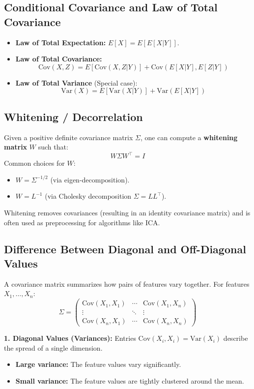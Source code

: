 \documentclass[12pt, a4paper]{report}
\begin{document}
\subsection{Conditional Covariance and Law of Total Covariance}
\begin{itemize}
    \item \textbf{Law of Total Expectation:} $E[X] = E[E[X|Y]]$.
    \item \textbf{Law of Total Covariance:}
    \begin{equation}
        \text{Cov}(X, Z) = E[\text{Cov}(X, Z|Y)] + \text{Cov}(E[X|Y], E[Z|Y])
    \end{equation}
    \item \textbf{Law of Total Variance} (Special case):
    \[ \text{Var}(X) = E[\text{Var}(X|Y)] + \text{Var}(E[X|Y]) \]
\end{itemize}

\subsection{Whitening / Decorrelation}
Given a positive definite covariance matrix $\Sigma$, one can compute a \textbf{whitening matrix} $W$ such that:
\[ W \Sigma W^\top = I \]
Common choices for $W$:
\begin{itemize}
    \item $W = \Sigma^{-1/2}$ (via eigen-decomposition).
    \item $W = L^{-1}$ (via Cholesky decomposition $\Sigma = LL^\top$).
\end{itemize}
Whitening removes covariances (resulting in an identity covariance matrix) and is often used as preprocessing for algorithms like ICA.

\subsection{Difference Between Diagonal and Off-Diagonal Values}
A covariance matrix summarizes how pairs of features vary together. For features $X_1, \dots, X_n$:
\[
\Sigma = \begin{pmatrix}
\text{Cov}(X_1, X_1) & \cdots & \text{Cov}(X_1, X_n) \\
\vdots & \ddots & \vdots \\
\text{Cov}(X_n, X_1) & \cdots & \text{Cov}(X_n, X_n)
\end{pmatrix}
\]

\textbf{1. Diagonal Values (Variances):}
Entries $\text{Cov}(X_i, X_i) = \text{Var}(X_i)$ describe the spread of a single dimension.
\begin{itemize}
    \item \textbf{Large variance:} The feature values vary significantly.
    \item \textbf{Small variance:} The feature values are tightly clustered around the mean.
\end{itemize}
\end{document}
